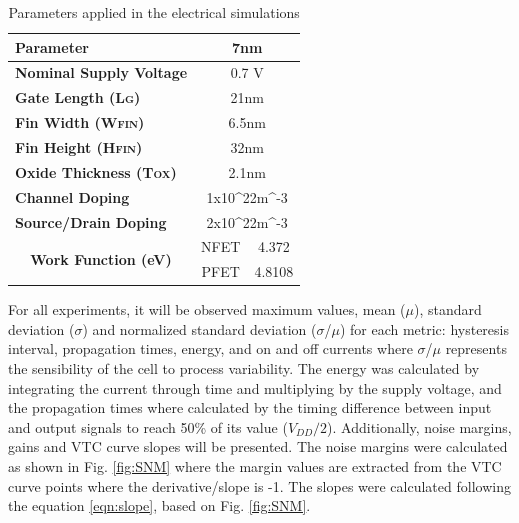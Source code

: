 \documentclass[pgmicro,mestrado,english]{iiufrgs}
\begin{document}
\begin{table}[H]
\centering
\caption{Parameters applied in the electrical simulations}
\label{electPar}
\begin{tabular}{lcc}
\hline
\textbf{Parameter}                                            & \multicolumn{2}{c}{\textbf{7nm}}                                  \\ \hline
\textbf{Nominal Supply Voltage}                               & \multicolumn{2}{c}{0.7 V}                                         \\ \hline
\textbf{Gate Length (L\textsc{g})}           & \multicolumn{2}{c}{21nm}                                          \\ \hline
\textbf{Fin Width (W\textsc{fin})}              & \multicolumn{2}{c}{6.5nm}                                         \\ \hline
\textbf{Fin Height (H\textsc{fin})}          & \multicolumn{2}{c}{32nm}                                          \\ \hline
\textbf{Oxide Thickness (T\textsc{ox})}      & \multicolumn{2}{c}{2.1nm}                                         \\ \hline
\textbf{Channel Doping}                                       & \multicolumn{2}{c}{1x10^{22}m^{-3}}                                     \\ \hline
\textbf{Source/Drain Doping}                                  & \multicolumn{2}{c}{2x10^{22}m^{-3}} \\ \hline
\multicolumn{1}{c}{\multirow{2}{*}{\textbf{Work Function (eV)}}} & NFET                            & 4.372                            \\ \cline{2-3}
\multicolumn{1}{c}{}                                        & PFET                            & 4.8108                           \\ \hline
\end{tabular}
\end{table}

For all experiments, it will be observed maximum values, mean (\(\mu\)), standard deviation (\(\sigma\)) and normalized standard deviation (\(\sigma\)/\(\mu\)) for each metric: hysteresis interval, propagation times, energy, and on and off currents where \(\sigma\)/\(\mu\) represents the sensibility of the cell to process variability. The energy was calculated by integrating the current through time and multiplying by the supply voltage, and the propagation times where calculated by the timing difference between input and output signals to reach 50\% of its value ($V_{DD}/2$). Additionally, noise margins, gains and VTC curve slopes will be presented. The noise margins were calculated as shown in Fig. \ref{fig:SNM} where the margin values are extracted from the VTC curve points where the derivative/slope is -1. The slopes were calculated following the equation \ref{eqn:slope}, based on Fig. \ref{fig:SNM}. 
\end{document}
